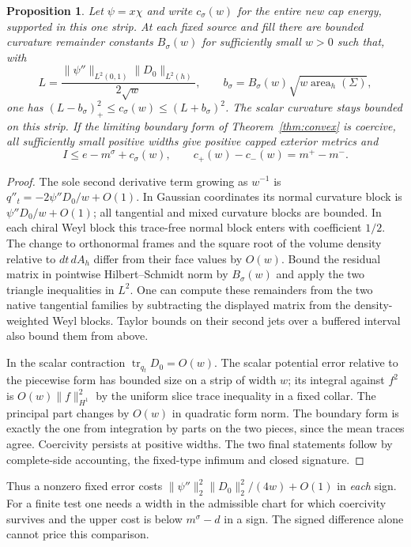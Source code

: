 \documentclass[11pt,letterpaper]{article}
\numberwithin{equation}{section}
\newtheorem{proposition}[theorem]{Proposition}
\DeclareMathOperator{\tr}{tr}
\begin{document}
\begin{proposition}\label{prop:finite-curved}
Let \(\psi=x\chi\) and write \(c_\sigma(w)\) for the entire new
cap energy, supported in this one strip. At each fixed source and
fill there are bounded curvature remainder constants \(B_\sigma(w)\)
for sufficiently small \(w>0\) such that, with
\[
 L=\frac{\|\psi''\|_{L^2(0,1)}\|D_0\|_{L^2(h)}}{2\sqrt w},
 \qquad b_\sigma=B_\sigma(w)\sqrt{w\operatorname{area}_h(\Sigma)},
\]
one has \((L-b_\sigma)_+^2\le c_\sigma(w)\le(L+b_\sigma)^2\).
The scalar curvature stays bounded on this strip. If the limiting
boundary form of Theorem~\ref{thm:convex} is coercive, all sufficiently
small positive widths give positive capped exterior metrics and
\[
   I\le e-m^\sigma+c_\sigma(w),\qquad
   c_+(w)-c_-(w)=m^+-m^- .
\]
\end{proposition}
\begin{proof}
The sole second derivative term growing as \(w^{-1}\) is
\(q''_t=-2\psi''D_0/w+O(1)\). In Gaussian coordinates its normal
curvature block is \(\psi''D_0/w+O(1)\); all tangential and mixed
curvature blocks are bounded. In each chiral Weyl block this
trace-free normal block enters with coefficient \(1/2\). The
change to orthonormal frames and the square root of the volume
density relative to \(dt\,dA_h\) differ from their face values by
\(O(w)\). Bound the residual matrix in pointwise Hilbert--Schmidt
norm by \(B_\sigma(w)\) and apply the two triangle inequalities
in \(L^2\). One can compute these remainders from the two native
tangential families by subtracting the displayed matrix from the
density-weighted Weyl blocks. Taylor bounds on their second jets
over a buffered interval also bound them from above.

In the scalar contraction \(\tr_{q_t}D_0=O(w)\).
The scalar potential error relative to the piecewise form has
bounded size on a strip of width \(w\); its integral against
\(f^2\) is \(O(w)\|f\|_{H^1}^2\) by the uniform slice trace
inequality in a fixed collar. The principal part changes by
\(O(w)\) in quadratic form norm. The boundary form is exactly
the one from integration by parts on the two pieces, since the
mean traces agree. Coercivity persists at positive widths.
The two final statements follow by complete-side accounting,
the fixed-type infimum and closed signature.
\end{proof}

Thus a nonzero fixed error costs
\(\|\psi''\|_2^2\|D_0\|_2^2/(4w)+O(1)\) in \emph{each} sign.
For a finite test one needs a width in the admissible chart for
which coercivity survives and the upper cost is below \(m^\sigma-d\)
in a sign. The signed difference alone cannot price this comparison.
\end{document}
